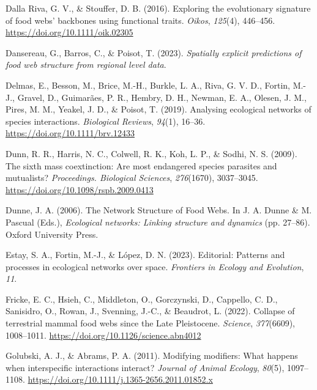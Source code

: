 \documentclass[
]{article}
\newlength{\cslhangindent}
\newenvironment{CSLReferences}[2] %
 {\begin{list}{}{%
  \setlength{\itemindent}{0pt}
  \setlength{\leftmargin}{0pt}
  \setlength{\parsep}{0pt}
  \ifodd #1
   \setlength{\leftmargin}{\cslhangindent}
   \setlength{\itemindent}{-1\cslhangindent}
  \fi
  \setlength{\itemsep}{#2\baselineskip}}}
 {\end{list}}
\begin{document}
\begin{CSLReferences}{1}{0}
Dalla Riva, G. V., \& Stouffer, D. B. (2016). Exploring the evolutionary
signature of food webs' backbones using functional traits. \emph{Oikos},
\emph{125}(4), 446--456. \url{https://doi.org/10.1111/oik.02305}

Dansereau, G., Barros, C., \& Poisot, T. (2023). \emph{Spatially
explicit predictions of food web structure from regional level data}.

Delmas, E., Besson, M., Brice, M.-H., Burkle, L. A., Riva, G. V. D.,
Fortin, M.-J., Gravel, D., Guimarães, P. R., Hembry, D. H., Newman, E.
A., Olesen, J. M., Pires, M. M., Yeakel, J. D., \& Poisot, T. (2019).
Analysing ecological networks of species interactions. \emph{Biological
Reviews}, \emph{94}(1), 16--36. \url{https://doi.org/10.1111/brv.12433}

Dunn, R. R., Harris, N. C., Colwell, R. K., Koh, L. P., \& Sodhi, N. S.
(2009). The sixth mass coextinction: Are most endangered species
parasites and mutualists? \emph{Proceedings. Biological Sciences},
\emph{276}(1670), 3037--3045.
\url{https://doi.org/10.1098/rspb.2009.0413}

Dunne, J. A. (2006). The {Network Structure} of {Food Webs}. In J. A.
Dunne \& M. Pascual (Eds.), \emph{Ecological networks: {Linking}
structure and dynamics} (pp. 27--86). Oxford University Press.

Estay, S. A., Fortin, M.-J., \& López, D. N. (2023). Editorial:
{Patterns} and processes in ecological networks over space.
\emph{Frontiers in Ecology and Evolution}, \emph{11}.

Fricke, E. C., Hsieh, C., Middleton, O., Gorczynski, D., Cappello, C.
D., Sanisidro, O., Rowan, J., Svenning, J.-C., \& Beaudrot, L. (2022).
Collapse of terrestrial mammal food webs since the {Late Pleistocene}.
\emph{Science}, \emph{377}(6609), 1008--1011.
\url{https://doi.org/10.1126/science.abn4012}

Golubski, A. J., \& Abrams, P. A. (2011). Modifying modifiers: What
happens when interspecific interactions interact? \emph{Journal of
Animal Ecology}, \emph{80}(5), 1097--1108.
\url{https://doi.org/10.1111/j.1365-2656.2011.01852.x}


\end{CSLReferences}
\end{document}
